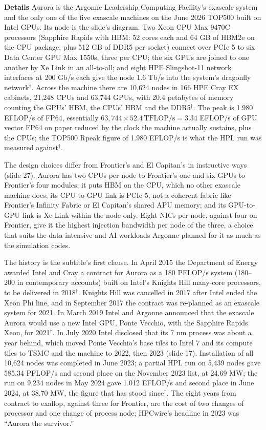 \documentclass[11pt,letterpaper]{article}
\newcommand{\para}[1]{\medskip\noindent\textbf{#1}\quad}
\begin{document}
\para{Details} Aurora is the Argonne Leadership Computing Facility's exascale system and the only one of the five exascale machines on the June 2026 TOP500 built on Intel GPUs. Its node is the slide's diagram. Two Xeon CPU Max 9470C processors (Sapphire Rapids with HBM: 52 cores each and 64 GB of HBM2e on the CPU package, plus 512 GB of DDR5 per socket) connect over PCIe 5 to six Data Center GPU Max 1550s, three per CPU; the six GPUs are joined to one another by Xe Link in an all-to-all; and eight HPE Slingshot-11 network interfaces at 200 Gb/s each give the node 1.6 Tb/s into the system's dragonfly network$^\dagger$. Across the machine there are 10{,}624 nodes in 166 HPE Cray EX cabinets, 21{,}248 CPUs and 63{,}744 GPUs, with 20.4 petabytes of memory counting the GPUs' HBM, the CPUs' HBM and the DDR5$^\dagger$. The peak is 1.980 EFLOP/s of FP64, essentially $63{,}744 \times 52.4\,\text{TFLOP/s} = 3.34$ EFLOP/s of GPU vector FP64 on paper reduced by the clock the machine actually sustains, plus the CPUs; the TOP500 Rpeak figure of 1.980 EFLOP/s is what the HPL run was measured against$^\dagger$.

The design choices differ from Frontier's and El Capitan's in instructive ways (slide 27). Aurora has two CPUs per node to Frontier's one and six GPUs to Frontier's four modules; it puts HBM on the CPU, which no other exascale machine does; its CPU-to-GPU link is PCIe 5, not a coherent fabric like Frontier's Infinity Fabric or El Capitan's shared APU memory; and its GPU-to-GPU link is Xe Link within the node only. Eight NICs per node, against four on Frontier, give it the highest injection bandwidth per node of the three, a choice that suits the data-intensive and AI workloads Argonne planned for it as much as the simulation codes.

The history is the subtitle's first clause. In April 2015 the Department of Energy awarded Intel and Cray a contract for Aurora as a 180 PFLOP/s system (180--200 in contemporary accounts) built on Intel's Knights Hill many-core processors, to be delivered in 2018$^\dagger$. Knights Hill was cancelled in 2017 after Intel ended the Xeon Phi line, and in September 2017 the contract was re-planned as an exascale system for 2021. In March 2019 Intel and Argonne announced that the exascale Aurora would use a new Intel GPU, Ponte Vecchio, with the Sapphire Rapids Xeon, for 2021$^\dagger$. In July 2020 Intel disclosed that its 7 nm process was about a year behind, which moved Ponte Vecchio's base tiles to Intel 7 and its compute tiles to TSMC and the machine to 2022, then 2023 (slide 17). Installation of all 10{,}624 nodes was completed in June 2023; a partial HPL run on 5{,}439 nodes gave 585.34 PFLOP/s and second place on the November 2023 list, at 24.69 MW; the run on 9{,}234 nodes in May 2024 gave 1.012 EFLOP/s and second place in June 2024, at 38.70 MW, the figure that has stood since$^\dagger$. The eight years from contract to exaflop, against three for Frontier, are the cost of two changes of processor and one change of process node; HPCwire's headline in 2023 was ``Aurora the survivor.''
\end{document}
